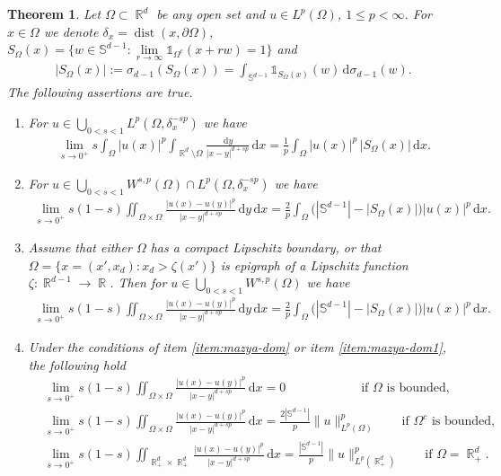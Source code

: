 \documentclass[12pt, reqno]{amsart}%
\theoremstyle{plain}  %
\newtheorem{theorem}{Theorem}[section]
\theoremstyle{definition}  %
\theoremstyle{remark}
\numberwithin{equation}{section}
\DeclareMathOperator{\dist}{dist}
\DeclareMathOperator{\R}{\mathbb{R}}
\renewcommand{\d}{\,\mathrm{d}}
\begin{document}
\begin{theorem}\label{thm:mazya-on-dom}
Let $\Omega\subset \R^d$ be any open set and  $u\in L^p(\Omega)$, $1\leq p<\infty$.  For $x\in\Omega$ we denote   $\delta_x= \dist(x,\partial \Omega)$,   $S_\Omega(x) =
 \{ w \in \mathbb{S}^{d-1} :  \lim\limits_{r\to \infty} \mathds{1}_{\Omega^c}(x+rw)=1\}$ and
\begin{align*}
 |S_\Omega(x)|:=\sigma_{d-1}(S_\Omega(x))=\int_{ \mathbb{S}^{d-1}} \mathds{1}_{S_\Omega(x)}(w)\d \sigma_{d-1}(w).
\end{align*}
The following assertions are true.
\begin{enumerate}
\item\label{item:mazya-dom0} For  $u\in \bigcup_{0 < s < 1} L^p(\Omega, \delta_x^{-sp})$ we have
\begin{align*}
\lim_{s\to0^+}
s \int_{\Omega} |u(x)|^p
\int_{\R^d \setminus \Omega}
\frac{\d y }{|x-y|^{d+sp}}  \d x
=\frac{1}{p}\int_{\Omega}
|u(x)|^p\,  |S_\Omega(x)| \d x.
\end{align*}
\item  \label{item:mazya-dom} For $u\in \bigcup_{0 < s < 1} W^{s,p}(\Omega)\cap L^p(\Omega, \delta_x^{-sp})$ we have
\begin{align*}
\lim_{s \to 0^+} s(1-s) \iint_{\Omega \times \Omega}
\frac{|u(x) - u(y)|^p}{|x-y|^{d+sp}} \d y \d x=
\frac{2}{p} \int_\Omega
\big(|\mathbb{S}^{d-1}| - |S_\Omega(x)|\big)|u(x)|^p \d x.
\end{align*}
\item \label{item:mazya-dom1} Assume that either $\Omega$ has a compact Lipschitz boundary, or that $\Omega=\{x= (x',x_d): x_d>\zeta(x')\}$ is epigraph of a Lipschitz function $\zeta:\R^{d-1}\to \R$. Then for $u\in \bigcup_{0 < s < 1} W^{s,p}(\Omega)$ we have
\begin{align*}
\lim_{s \to 0^+} s(1-s) \iint_{\Omega \times \Omega}
\frac{|u(x) - u(y)|^p}{|x-y|^{d+sp}} \d y \d x=
\frac{2}{p} \int_\Omega
\big(|\mathbb{S}^{d-1}| - |S_\Omega(x)|\big) |u(x)|^p \d x.
\end{align*}
\item\label{item:mazya-dom2} Under the conditions of item \eqref{item:mazya-dom} or  item  \eqref{item:mazya-dom1}, the following hold
\begin{align*}
&\lim_{s\to0^+}
s(1-s) \iint_{\Omega \times\Omega}
\frac{|u(x)-u(y)|^p}{|x-y|^{d+sp}}  \d x =0
\qquad\qquad\qquad \text{if $\Omega$ is bounded},\\
&\lim_{s\to0^+}
s(1-s) \iint_{\Omega \times\Omega}
\frac{|u(x)-u(y)|^p}{|x-y|^{d+sp}}  \d x =  \frac{2|\mathbb{S}^{d-1}|}{p}
\|u\|^p_{L^p(\Omega)}
\qquad\text{if $\Omega^c$ is bounded},\\
&\lim_{s\to0^+}
s(1-s)\iint_{\R^d_+\times \R^d_+}
\frac{|u(x)-u(y)|^p}{|x-y|^{d+sp}}  \d x =  \frac{|\mathbb{S}^{d-1}|}{p}\|u\|^p_{L^p(\R^d_+)}\qquad\text{if $\Omega=\R^d_+$}.
\end{align*}
\end{enumerate}
\end{theorem}
\end{document}
